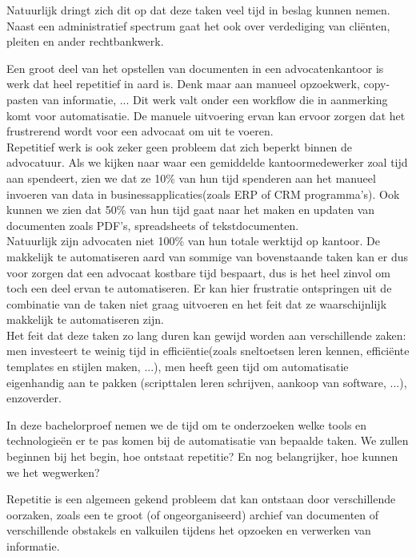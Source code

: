 Natuurlijk dringt zich dit op dat deze taken veel tijd in beslag kunnen nemen. Naast een administratief spectrum gaat het ook over verdediging van cliënten, pleiten en ander rechtbankwerk.

Een groot deel van het opstellen van documenten in een advocatenkantoor is werk dat heel repetitief in aard is. 
Denk maar aan manueel opzoekwerk, copy-pasten van informatie, ... 
Dit werk valt onder een workflow die in aanmerking komt voor automatisatie. 
De manuele uitvoering ervan kan ervoor zorgen dat het frustrerend wordt voor een advocaat om uit te voeren. \\

Repetitief werk is ook zeker geen probleem dat zich beperkt binnen de advocatuur. 
Als we kijken naar waar een gemiddelde kantoormedewerker zoal tijd aan spendeert, zien we dat ze 10\% van hun tijd spenderen aan het manueel invoeren van data in businessapplicaties(zoals \Gls{ERP} of \Gls{CRM} programma's). 
Ook kunnen we zien dat 50\% van hun tijd gaat naar het maken en updaten van documenten zoals PDF's, spreadsheets of tekstdocumenten. \autocite{Workfellow} \\ 

Natuurlijk zijn advocaten niet 100\% van hun totale werktijd op kantoor. 
De makkelijk te automatiseren aard van sommige van bovenstaande taken kan er dus voor zorgen dat een advocaat kostbare tijd bespaart, dus is het heel zinvol om toch een deel ervan te automatiseren. 
Er kan hier frustratie ontspringen uit de combinatie van de taken niet graag uitvoeren en het feit dat ze waarschijnlijk makkelijk te automatiseren zijn. \\

Het feit dat deze taken zo lang duren kan gewijd worden aan verschillende zaken: men investeert te weinig tijd in efficiëntie(zoals sneltoetsen leren kennen, efficiënte templates en stijlen maken, ...), 
men heeft geen tijd om automatisatie eigenhandig aan te pakken (scripttalen leren schrijven, aankoop van software, ...), enzoverder. 

In deze bachelorproef nemen we de tijd om te onderzoeken welke tools en technologieën er te pas komen bij de automatisatie van bepaalde taken. 
We zullen beginnen bij het begin, hoe ontstaat repetitie? En nog belangrijker, hoe kunnen we het wegwerken? 

Repetitie is een algemeen gekend probleem dat kan ontstaan door verschillende oorzaken, 
zoals een te groot (of ongeorganiseerd) archief van documenten of verschillende obstakels en valkuilen tijdens het opzoeken en verwerken van informatie. 

